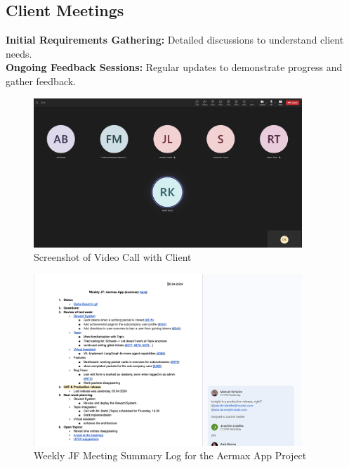 \subsection{Client Meetings}
\textbf{Initial Requirements Gathering:} Detailed discussions to understand client needs. \\
\textbf{Ongoing Feedback Sessions:} Regular updates to demonstrate progress and gather feedback.
\begin{figure}[H]
    \centering
    \includegraphics[width=0.9\textwidth]{src/assets/chapters/JF MEETING.png}
    \caption{Screenshot of Video Call with Client}
    \label{fig:client_meeting}
\end{figure}
\begin{figure}[H]
    \centering
    \includegraphics[width=0.9\textwidth]{src/assets/chapters/JF.png}
    \caption{ Weekly JF Meeting Summary Log for the Aermax App Project}
    \label{fig:Weekly_JF}
\end{figure}

